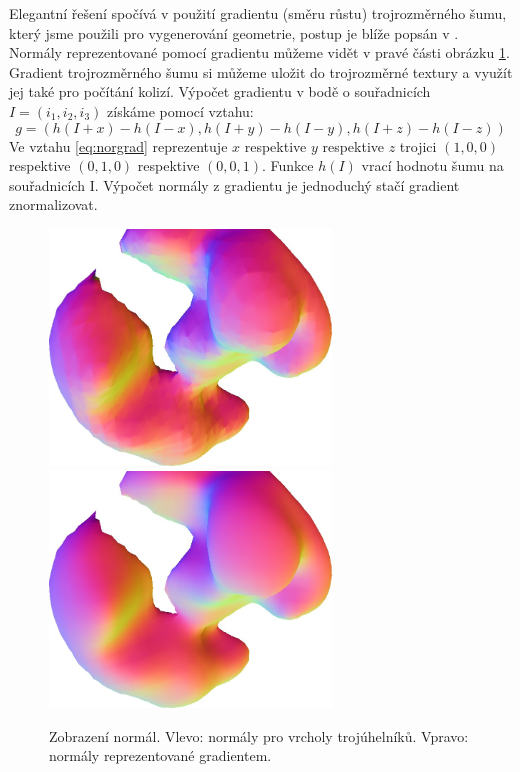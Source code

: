 Elegantní řešení spočívá v použití gradientu (směru růstu) trojrozměrného šumu, který jsme použili pro vygenerování geometrie, postup je blíže popsán v \cite{KASKADY}.
Normály reprezentované pomocí gradientu můžeme vidět v pravé části obrázku \ref{fig:normaly}.
Gradient trojrozměrného šumu si můžeme uložit do trojrozměrné textury a využít jej také pro počítání kolizí.
Výpočet gradientu v bodě o souřadnicích $I=(i_1,i_2,i_3)$ získáme pomocí vztahu:
\begin{equation}
\label{eq:norgrad}
g=(h(I+x)-h(I-x),h(I+y)-h(I-y),h(I+z)-h(I-z))
\end{equation}
Ve vztahu \ref{eq:norgrad} reprezentuje $x$ respektive $y$ respektive $z$ trojici $(1,0,0)$ respektive $(0,1,0)$ respektive $(0,0,1)$.
Funkce $h(I)$ vrací hodnotu šumu na souřadnicích I.
Výpočet normály z gradientu je jednoduchý stačí gradient znormalizovat.


\begin{figure}[h]
\centering
\includegraphics[width=7.5cm,keepaspectratio]{obr/normalsum.jpg}
\includegraphics[width=7.5cm,keepaspectratio]{obr/normalgradient.jpg}
\caption{Zobrazení normál. Vlevo: normály pro vrcholy trojúhelníků. Vpravo: normály reprezentované gradientem.}
\label{fig:normaly}
\end{figure}



